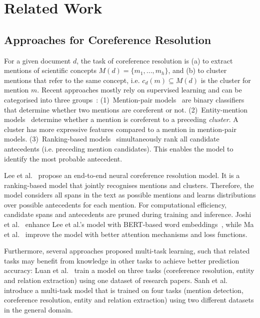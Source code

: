 \documentclass[runningheads]{llncs}
\begin{document}
\section{Related Work}
\label{sec:related_work}


\subsection{Approaches for Coreference Resolution}
For a given document $d$, the task of coreference resolution is (a) to extract mentions of scientific concepts $M(d) = \{m_1, ..., m_h\}$, and (b) to cluster mentions that refer to the same concept, i.e. $c_d(m) \subseteq M(d)$ is the cluster for mention $m$. 
Recent approaches mostly rely on supervised learning and can be categorised into three groups~\cite{Ng2017Coreference}:
(1)~Men\-tion-pair models~\cite{NgC02Coreference,SoonNL01Coref} are binary classifiers that determine whether two mentions are coreferent or not. 
(2)~Entity-mention models~\cite{ClarkM15Coref,RahmanN09Coref} determine whether a mention is coreferent to a preceding \emph{cluster}. A cluster has more expressive features compared to a mention in mention-pair models. 
(3)~Ranking-based models~\cite{DenisB08Coref,Lee2017EndtoendNC,MarasovicBOF17Coref} simultaneously rank all candidate antecedents (i.e. preceding mention candidates). This enables the model to identify the most probable antecedent.  

Lee et al.~\cite{Lee2017EndtoendNC,LeeHZ18Coreference} propose an end-to-end neural coreference resolution model. It is a ranking-based model that jointly recognises mentions and clusters. Therefore, the model considers all spans in the text as possible mentions and learns distributions over possible antecedents for each mention. For computational efficiency, candidate spans and antecedents are pruned during training and inference.
Joshi et al.~\cite{Joshi2020BFCR} enhance Lee et al.'s model with BERT-based word embeddings~\cite{Devlin2018BERTPO}, while Ma et al.~\cite{Ma0LHPSL20JointlyCoreference} improve the model with better attention mechanisms and loss functions. 

Furthermore, several approaches proposed multi-task learning, such that related tasks may benefit from knowledge in other tasks to achieve better prediction accuracy:
Luan et al.~\cite{Luan2018MultiTaskIO,WaddenWLH19DyGIE} train a model on three tasks (coreference resolution, entity and relation extraction) using one dataset of research papers. 
Sanh et al.~\cite{Sanh2018AHM} introduce a multi-task model that is trained on four tasks (mention detection, coreference resolution, entity and relation extraction) using two different datasets in the general domain. 
\end{document}
